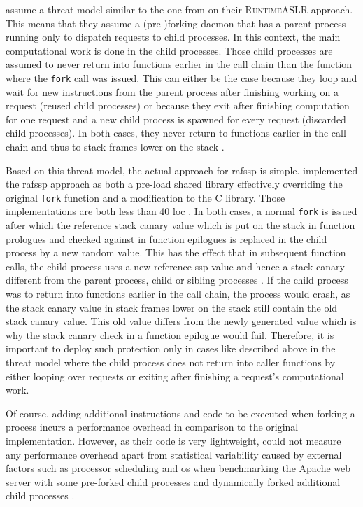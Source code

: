  assume a threat model similar to the one from \citeauthor{Lu2016} on their \textsc{RuntimeASLR} approach.
This means that they assume a (pre-)forking daemon that has a parent process running only to dispatch requests to child processes.
In this context, the main computational work is done in the child processes.
Those child processes are assumed to never return into functions earlier in the call chain than the function where the \texttt{fork} call was issued.
This can either be the case because they loop and wait for new instructions from the parent process after finishing working on a request (reused child processes) or because they exit after finishing computation for one request and a new child process is spawned for every request (discarded child processes).
In both cases, they never return to functions earlier in the call chain and thus to stack frames lower on the stack \cite[245\psq]{MarcoGisbert2013}.

Based on this threat model, the actual approach for \gls{rafssp} is simple.
 implemented the \gls{rafssp} approach as both a pre-load shared library effectively overriding the original \texttt{fork} function and a modification to the C library.
Those implementations are both less than 40 \gls{loc} \cite[247]{MarcoGisbert2013}.
In both cases, a normal \texttt{fork} is issued after which the reference stack canary value which is put on the stack in function prologues and checked against in function epilogues is replaced in the child process by a new random value.
This has the effect that in subsequent function calls, the child process uses a new reference \gls{ssp} value and hence a stack canary different from the parent process, child or sibling processes \cite[245\psqq]{MarcoGisbert2013}.
If the child process was to return into functions earlier in the call chain, the process would crash, as the stack canary value in stack frames lower on the stack still contain the old stack canary value.
This old value differs from the newly generated value which is why the stack canary check in a function epilogue would fail.
Therefore, it is important to deploy such protection only in cases like described above in the threat model where the child process does not return into caller functions by either looping over requests or exiting after finishing a request's computational work.

Of course, adding additional instructions and code to be executed when forking a process incurs a performance overhead in comparison to the original implementation.
However, as their code is very lightweight, \citeauthor{MarcoGisbert2013} could not measure any performance overhead apart from statistical variability caused by external factors such as processor scheduling and \gls{os} when benchmarking the Apache web server with some pre-forked child processes and dynamically forked additional child processes \cite[249\psq]{MarcoGisbert2013}.

